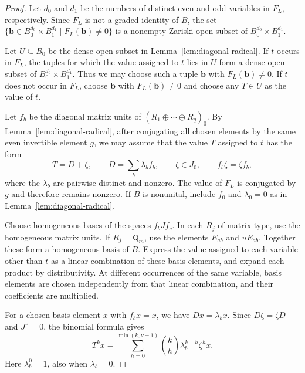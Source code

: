 \documentclass[11pt,reqno]{amsart}
\newcommand{\Qtype}{\mathsf Q}
\theoremstyle{definition}
\theoremstyle{remark}
\numberwithin{equation}{section}
\begin{document}
\begin{proof}
Let $d_0$ and $d_1$ be the numbers of distinct even and odd
variables in $F_L$, respectively.
Since $F_L$ is not a graded identity of $B$, the set
$\{\mathbf b\in B_0^{d_0}\times B_1^{d_1}\mid
F_L(\mathbf b)\ne0\}$
is a nonempty Zariski open subset of
$B_0^{d_0}\times B_1^{d_1}$.

Let $U\subseteq B_0$ be the dense open subset in
Lemma~\ref{lem:diagonal-radical}.
If $t$ occurs in $F_L$, the tuples for which the value
assigned to $t$ lies in $U$ form a dense open subset of
$B_0^{d_0}\times B_1^{d_1}$.
Thus we may choose such a tuple $\mathbf b$ with
$F_L(\mathbf b)\ne0$.
If $t$ does not occur in $F_L$, choose $\mathbf b$ with
$F_L(\mathbf b)\ne0$ and choose any $T\in U$
as the value of $t$.

Let $f_b$ be the diagonal matrix units of
$(R_1\oplus\cdots\oplus R_q)_0$.
By Lemma~\ref{lem:diagonal-radical}, after conjugating
all chosen elements by the same even invertible element $g$,
we may assume that the value $T$ assigned to $t$
has the form
\[
T=D+\zeta,\qquad
D=\sum_b\lambda_b f_b,\qquad
\zeta\in J_0,\qquad f_b\zeta=\zeta f_b,
\]
where the $\lambda_b$ are pairwise distinct and nonzero.
The value of $F_L$ is conjugated by $g$
and therefore remains nonzero.
If $B$ is nonunital, include $f_0$ and $\lambda_0=0$
as in Lemma~\ref{lem:diagonal-radical}.

Choose homogeneous bases of the spaces $f_bJf_c$.
In each $R_j$ of matrix type, use the homogeneous
matrix units.
If $R_j=\Qtype_m$, use the elements $E_{ab}$ and $uE_{ab}$.
Together these form a homogeneous basis of $B$.
Express the value assigned to each variable other than $t$
as a linear combination of these basis elements,
and expand each product by distributivity.
At different occurrences of the same variable, basis
elements are chosen independently from that
linear combination, and their coefficients are multiplied.



For a chosen basis element $x$ with $f_bx=x$, we have
$Dx=\lambda_bx$.
Since $D\zeta=\zeta D$ and $J^\nu=0$, the binomial formula gives
\begin{equation}\label{eq:binomial-radical}
T^kx
=\sum_{h=0}^{\min(k,\nu-1)}
\binom{k}{h}\lambda_b^{k-h}\zeta^h x.
\end{equation}
Here $\lambda_b^0=1$, also when $\lambda_b=0$.


\end{proof}
\end{document}
